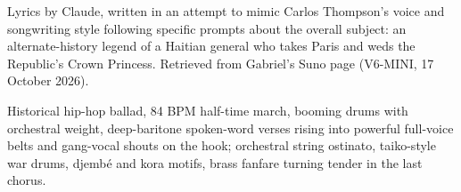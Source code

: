 
\label{sec:long-way-to-paris}
\begin{notes}
Lyrics by Claude, written in an attempt to mimic Carlos Thompson's voice and songwriting style following specific prompts about the overall subject: an alternate-history legend of a Haitian general who takes Paris and weds the Republic's Crown Princess. Retrieved from Gabriel's Suno page (V6-MINI, 17 October 2026).
\end{notes}
\begin{style}
Historical hip-hop ballad, 84 BPM half-time march, booming drums with orchestral weight, deep-baritone spoken-word verses rising into powerful full-voice belts and gang-vocal shouts on the hook; orchestral string ostinato, taiko-style war drums, djembé and kora motifs, brass fanfare turning tender in the last chorus.
\end{style}
